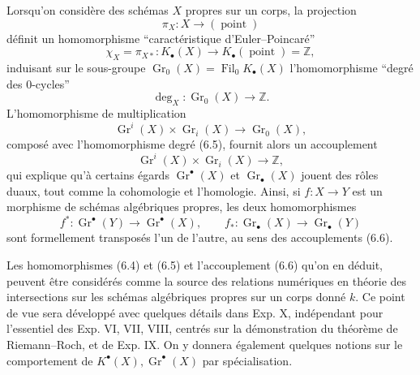 \documentclass[11pt]{article}
\newcommand{\Gr}{\operatorname{Gr}}
\newcommand{\Fil}{\operatorname{Fil}}
\begin{document}
Lorsqu'on consid\`ere des sch\'emas $X$ propres sur un corps, la projection
\[
\pi_X:X\longrightarrow(\operatorname{point})
\]
d\'efinit un homomorphisme ``caract\'eristique d'Euler--Poincar\'e''
\begin{equation}\tag{6.4}
\chi_X=\pi_{X*}:K_\bullet(X)\longrightarrow K_\bullet(\operatorname{point})=\mathbb Z,
\end{equation}
induisant sur le sous-groupe $\Gr_0(X)=\Fil_0K_\bullet(X)$ l'homomorphisme ``degr\'e des $0$-cycles''
\begin{equation}\tag{6.5}
\deg_X:\Gr_0(X)\longrightarrow \mathbb Z.
\end{equation}
L'homomorphisme de multiplication
\[
\Gr^i(X)\times\Gr_i(X)\longrightarrow \Gr_0(X),
\]
compos\'e avec l'homomorphisme degr\'e (6.5), fournit alors un accouplement
\begin{equation}\tag{6.6}
\Gr^i(X)\times \Gr_i(X)\longrightarrow \mathbb Z,
\end{equation}
qui explique qu'\`a certains \'egards $\Gr^\bullet(X)$ et $\Gr_\bullet(X)$ jouent des r\^oles duaux, tout comme la cohomologie et l'homologie. Ainsi, si $f:X\to Y$ est un morphisme de sch\'emas alg\'ebriques propres, les deux homomorphismes
\[
f^*:\Gr^\bullet(Y)\longrightarrow \Gr^\bullet(X),\qquad f_*:\Gr_\bullet(X)\longrightarrow \Gr_\bullet(Y)
\]
sont formellement transpos\'es l'un de l'autre, au sens des accouplements (6.6).

Les homomorphismes (6.4) et (6.5) et l'accouplement (6.6) qu'on en d\'eduit, peuvent \^etre consid\'er\'es comme la source des relations num\'eriques en th\'eorie des intersections sur les sch\'emas alg\'ebriques propres sur un corps donn\'e $k$. Ce point de vue sera d\'evelopp\'e avec quelques d\'etails dans Exp. X, ind\'ependant pour l'essentiel des Exp. VI, VII, VIII, centr\'es sur la d\'emonstration du th\'eor\`eme de Riemann--Roch, et de Exp. IX. On y donnera \'egalement quelques notions sur le comportement de $K^\bullet(X),\Gr^\bullet(X)$ par sp\'ecialisation.
\end{document}
